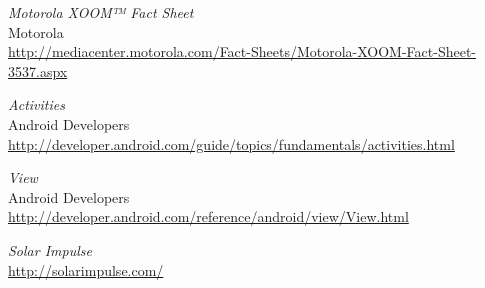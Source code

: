 \begin{thebibliography}{widest-label}
	\emph{Motorola XOOM™ Fact Sheet}\\
	Motorola\\
	\url{http://mediacenter.motorola.com/Fact-Sheets/Motorola-XOOM-Fact-Sheet-3537.aspx}

	\emph{Activities}\\
	Android Developers\\
	\url{http://developer.android.com/guide/topics/fundamentals/activities.html}
	
	\emph{View}\\
	Android Developers\\
	\url{http://developer.android.com/reference/android/view/View.html}

	\emph{Solar Impulse}\\
	\url{http://solarimpulse.com/}

\end{thebibliography}
